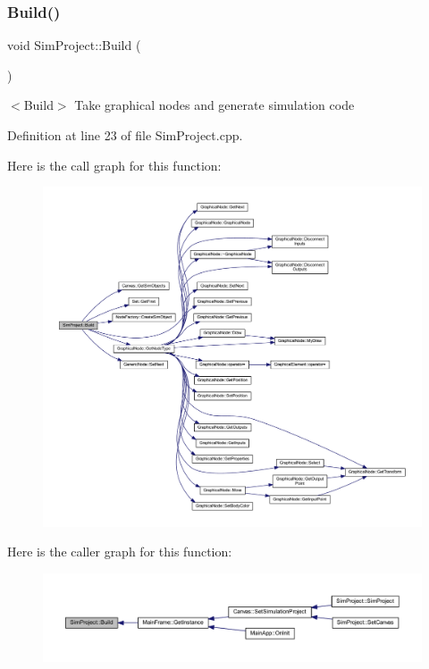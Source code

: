 \subsubsection{\texorpdfstring{Build()}{Build()}}
{\footnotesize\ttfamily void Sim\+Project\+::\+Build (\begin{DoxyParamCaption}{ }\end{DoxyParamCaption})}

$<$\+Build$>$ Take graphical nodes and generate simulation code 

Definition at line 23 of file Sim\+Project.\+cpp.

Here is the call graph for this function\+:
\nopagebreak
\begin{figure}[H]
\begin{center}
\leavevmode
\includegraphics[width=350pt]{class_sim_project_afefd1eb6d63ea4e0c698084d51a29fcd_cgraph}
\end{center}
\end{figure}
Here is the caller graph for this function\+:
\nopagebreak
\begin{figure}[H]
\begin{center}
\leavevmode
\includegraphics[width=350pt]{class_sim_project_afefd1eb6d63ea4e0c698084d51a29fcd_icgraph}
\end{center}
\end{figure}
\mbox{\label{class_sim_project_af638b9bd89328caf5c24f1189abe714b}} 
